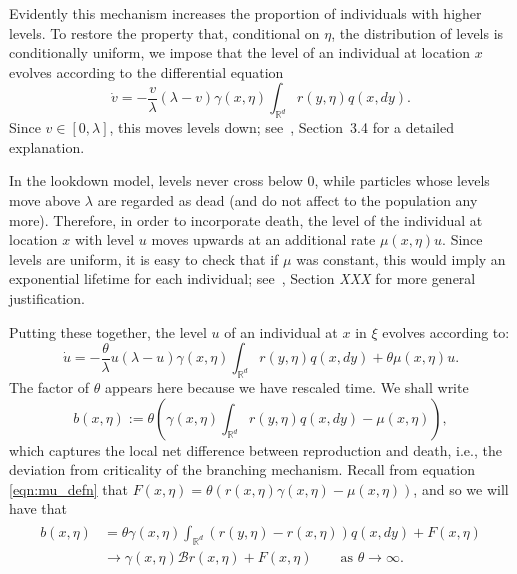 \documentclass[12pt]{article}
\newcommand{\IR}{\mathbb R}
\newcommand{\DG}{\mathcal{B}}  %
\newcommand{\lp}{\xi}              %
\newcommand{\comment}[1]{{\color{blue} \it #1}}
\begin{document}
Evidently this mechanism increases the proportion
of individuals with higher levels.
To restore the property that,
conditional on $\eta$,
the distribution of levels is conditionally uniform,
we impose that 
the level of an individual at location $x$
evolves according to the differential equation
$$
    \dot{v}
    =
    - \frac{v}{\lambda} \left(\lambda - v\right)
    \gamma(x, \eta) \int_{\IR^d} r(y, \eta) q(x, dy) .
$$
Since $v \in [0, \lambda]$, this moves levels down;
see~\cite{etheridge/kurtz:2018}, Section~3.4 for a detailed explanation.

In the lookdown model, levels never cross below 0,
while particles whose levels move above $\lambda$ are regarded as dead
(and do not affect to the population any more).
Therefore, in order to incorporate death,
the level of the individual at location $x$ with level $u$
moves upwards at an additional rate $\mu(x,\eta) u$.
Since levels are uniform,
it is easy to check that if $\mu$ was constant,
this would imply an exponential lifetime for each individual;
see~\cite{etheridge/kurtz:2018}, Section \comment{XXX}
for more general justification.

Putting these together,
the level $u$ of an individual at $x$ in $\lp$ evolves according to:
\begin{equation} \label{eqn:dot_u}
    \dot u
    =
    - \frac{\theta}{\lambda} u \left(\lambda - u\right)
    \gamma(x, \eta) \int_{\IR^d} r(y, \eta) q(x, dy) 
    +
    \theta \mu(x,\eta) u .
\end{equation}
The factor of $\theta$ appears here because we have rescaled time.
We shall write 
$$
    b(x, \eta)
    :=
    \theta\left(
    \gamma(x,\eta) \int_{\IR^d} r(y, \eta) q(x, dy)
    -
    \mu(x,\eta)
    \right) ,
$$
which captures the local net difference between reproduction and death,
i.e., the deviation from criticality of the branching mechanism.
Recall from equation \eqref{eqn:mu_defn} that
$F(x,\eta) = \theta(r(x,\eta)\gamma(x,\eta) - \mu(x,\eta))$,
and so we will have that
\begin{align} \label{eqn:b_limit}
\begin{split}
b(x, \eta)
&=
    \theta \gamma(x, \eta) \int_{\IR^d} \left( r(y, \eta) - r(x, \eta) \right) q(x, dy)
    + F(x, \eta) \\
&\to
    \gamma(x, \eta) \DG r(x, \eta) + F(x, \eta) \qquad \text{as } \theta \to \infty .
\end{split}
\end{align}
\end{document}
